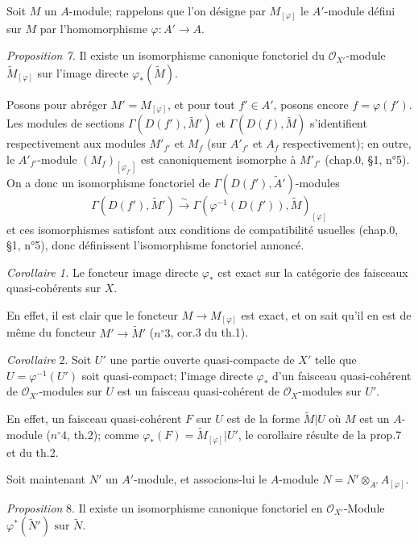 Soit $M$ un $A$-module; rappelons que l'on désigne par $M_{[\varphi]}$ le $A'$-module défini sur $M$ par l'homomorphisme $\varphi : A' \to A$.

\emph{Proposition 7.} Il existe un isomorphisme canonique fonctoriel du $\mathcal{O}_{X'}$-module $\tilde{M}_{[\varphi]}$ sur l'image directe $\varphi_*(\tilde{M})$.

Posons pour abréger $M' = M_{[\varphi]}$, et pour tout $f' \in A'$, posons encore $f = \varphi(f')$. Les modules de sections $\Gamma(D(f'), \tilde{M}')$ et $\Gamma(D(f), \tilde{M})$ s'identifient respectivement aux modules $M'_{f'}$ et $M_f$ (sur $A'_{f'}$ et $A_f$ respectivement); en outre, le $A'_{f'}$-module $(M_f)_{[\varphi_{f'}]}$ est canoniquement isomorphe à $M'_{f'}$ (chap.0, §1, n°5). 
On a donc un isomorphisme fonctoriel de $\Gamma(D(f'), \tilde{A}')$-modules
$$\Gamma(D(f'), \tilde{M}') \xrightarrow{\sim} \Gamma(\varphi^{-1}(D(f')), \tilde{M})_{[\varphi]}$$
et ces isomorphismes satisfont aux conditions de compatibilité usuelles (chap.0, §1, n°5), donc définissent l'isomorphisme fonctoriel annoncé.

\emph{Corollaire 1.} Le foncteur image directe $\varphi_*$ est exact sur la catégorie des faisceaux quasi-cohérents sur $X$.

\newpage


\noindent En effet, il est clair que le foncteur $M \to M_{[\varphi]}$ est exact, et on sait qu'il en est de même du foncteur $M' \to \tilde{M}'$ ($n^{\circ}3$, cor.3 du th.1).

\noindent \emph{Corollaire} 2. Soit $U'$ une partie ouverte quasi-compacte de $X'$ telle que $U = \varphi^{-1}(U')$ soit quasi-compact; l'image directe $\varphi_*$ d'un faisceau quasi-cohérent de $\mathcal{O}_{X'}$-modules sur $U$ est un faisceau quasi-cohérent de $\mathcal{O}_X$-modules sur $U'$.

\noindent En effet, un faisceau quasi-cohérent $F$ sur $U$ est de la forme $\tilde{M}|U$ où $M$ est un $A$-module ($n^{\circ}4$, th.2); comme $\varphi_*(F) = \tilde{M}_{[ \varphi ]}|U'$, le corollaire résulte de la prop.7 et du th.2.

\noindent Soit maintenant $N'$ un $A'$-module, et associons-lui le $A$-module $N = N' \otimes_{A'} A_{[\varphi]}$.

\noindent \emph{Proposition} 8. Il existe un isomorphisme canonique fonctoriel en $\mathcal{O}_{X'}$-Module $\varphi^*(\tilde{N}') \text{ sur } \tilde{N}$.

